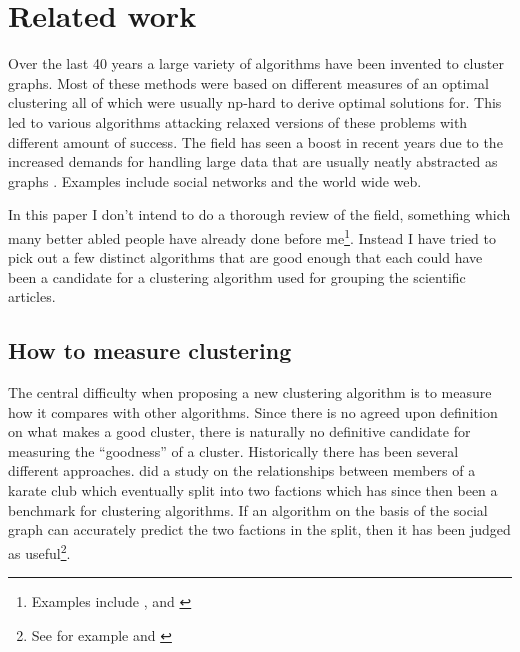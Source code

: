 \section{Related work}

Over the last 40 years a large variety of algorithms have been invented 
to cluster graphs. Most of these methods were based on different 
measures of an optimal clustering all of which were usually np-hard to 
derive optimal solutions for. This led to various algorithms attacking 
relaxed versions of these problems with different amount of success.  
The field has seen a boost in recent years due to the increased demands 
for handling large data that are usually neatly abstracted as graphs 
\cite[p.  2]{fortunato2010}.  Examples include social networks and the 
world wide web.

In this paper I don't intend to do a thorough review of the field, 
something which many better abled people have already done before 
me\footnote{Examples include \cite{newman2004}, \cite{schaeffer2007} and 
\cite{fortunato2010}}. Instead I have tried to pick out a few distinct 
algorithms that are good enough that each could have been a candidate 
for a clustering algorithm used for grouping the scientific articles.



\subsection{How to measure clustering}

The central difficulty when proposing a new clustering algorithm is to 
measure how it compares with other algorithms. Since there is no agreed 
upon definition on what makes a good cluster, there is naturally no 
definitive candidate for measuring the ``goodness'' of a cluster.  
Historically there has been several different approaches.  
\cite{zachary1977} did a study on the relationships between members of a 
karate club which eventually split into two factions which has since 
then been a benchmark for clustering algorithms. If an algorithm on the 
basis of the social graph can accurately predict the two factions in the 
split, then it has been judged as useful\footnote{See for example 
\cite{girvan2002} and \cite{lancichinetti2009}}.

